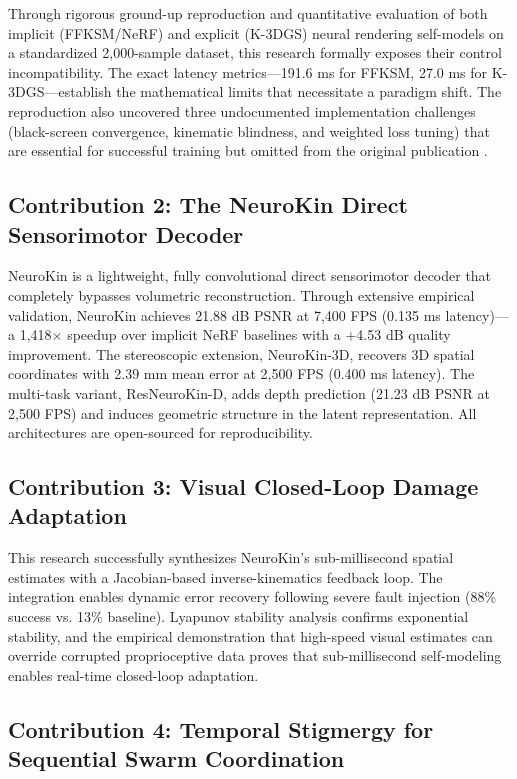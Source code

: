 ﻿\documentclass[12pt,a4paper,oneside]{report}
\begin{document}
Through rigorous ground-up reproduction and quantitative evaluation of both implicit (FFKSM/NeRF) and explicit (K-3DGS) neural rendering self-models on a standardized 2,000-sample dataset, this research formally exposes their control incompatibility. The exact latency metrics---191.6 ms for FFKSM, 27.0 ms for K-3DGS---establish the mathematical limits that necessitate a paradigm shift. The reproduction also uncovered three undocumented implementation challenges (black-screen convergence, kinematic blindness, and weighted loss tuning) that are essential for successful training but omitted from the original publication \cite{hu2024teaching}.

\subsection{Contribution 2: The NeuroKin Direct Sensorimotor Decoder}

NeuroKin is a lightweight, fully convolutional direct sensorimotor decoder that completely bypasses volumetric reconstruction. Through extensive empirical validation, NeuroKin achieves 21.88 dB PSNR at 7,400 FPS (0.135 ms latency)---a 1,418$\times$ speedup over implicit NeRF baselines with a +4.53 dB quality improvement. The stereoscopic extension, NeuroKin-3D, recovers 3D spatial coordinates with 2.39 mm mean error at 2,500 FPS (0.400 ms latency). The multi-task variant, ResNeuroKin-D, adds depth prediction (21.23 dB PSNR at 2,500 FPS) and induces geometric structure in the latent representation. All architectures are open-sourced for reproducibility.

\subsection{Contribution 3: Visual Closed-Loop Damage Adaptation}

This research successfully synthesizes NeuroKin's sub-millisecond spatial estimates with a Jacobian-based inverse-kinematics feedback loop. The integration enables dynamic error recovery following severe fault injection (88\% success vs. 13\% baseline). Lyapunov stability analysis confirms exponential stability, and the empirical demonstration that high-speed visual estimates can override corrupted proprioceptive data proves that sub-millisecond self-modeling enables real-time closed-loop adaptation.

\subsection{Contribution 4: Temporal Stigmergy for Sequential Swarm Coordination}
\end{document}
